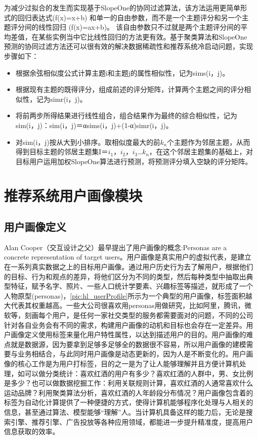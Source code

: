 		为减少过拟合的发生而实现基于SlopeOne的协同过滤算法，该方法运用更简单形式的回归表达式(f(x)=x+b) 和单一的自由参数，而不是一个主题评分和另一个主题评分间的线性回归 (f(x)=ax+b)。 该自由参数只不过就是两个主题评分间的平均差值，在某些实例当中它比线性回归的方法更有效。基于聚类算法和SlopeOne预测的协同过滤方法还可以很有效的解决数据稀疏性和推荐系统冷启动问题，实现步骤如下：
		\begin{itemize}
		\item 根据余弦相似度公式计算主题i和主题j的属性相似性，记为sims(i，j)。
		\item 根据现有主题的既得评分，组成前述的评分矩阵，计算两个主题之间的评分相似性，记为simr(i，j)。
		\item 将前两步所得结果进行线性组合，组合结果作为最终的综合相似性，记为sim(i，j)：sim(i，j)＝αsims(i，j)+(1-α)simr(i，j)。
		\item 对sim(i，j)按从大到小排序。取相似度最大的前$k_n$个主题作为邻居主题，从而得到目标主题的邻居主题集I＝{$i_1$，$i_2$，$i_3$…$k_n$}，在这个邻居主题集的基础上，对目标用户运用加权SlopeOne算法进行预测，将预测评分填入空缺的评分矩阵。
		\end{itemize}

	\section{推荐系统用户画像模块}
		\subsection{用户画像定义}
		\label{chap:example}
		Alan Cooper（交互设计之父）最早提出了用户画像的概念:Personas are a concrete representation of target users。用户画像是真实用户的虚拟代表，是建立在一系列真实数据之上的目标用户画像。通过用户历史行为去了解用户，根据他们的目标、行为和观点的差异，将他们区分为不同的类型，然后每种类型中抽取出典型特征，赋予名字、照片、一些人口统计学要素、兴趣标签等描述，就形成了一个人物原型(personas)，\autoref{pic:hl_userProfile}所示为一个典型的用户画像，标签面积越大代表其权重越高。一些大公司很喜欢用personas用做研究，比如阿里，腾讯，微软等，刻画每个用户，是任何一家社交类型的服务都需要面对的问题，不同的公司针对各自业务会有不同的需求，构建用户画像的动机和目标也会存在一定差异。用户画像定义使用标签来量化用户特性属性，以达到描述用户的目的。用户画像的难点就是数据源，因为要拿到足够多足够全的数据很不容易，所以用户画像的建模需要与业务相结合，与此同时用户画像是动态更新的，因为人是不断变化的。用户画像的核心工作是为用户打标签，目的之一是为了让人能够理解并且方便计算机处理，如可以做分类统计：喜欢红酒的用户有多少？喜欢红酒的人群中，男、女比例是多少？也可以做数据挖掘工作：利用关联规则计算，喜欢红酒的人通常喜欢什么运动品牌？利用聚类算法分析，喜欢红酒的人年龄段分布情况？用户画像包含着的标签为自动化计算提供了一种便捷的方式，使得计算机能够程序化处理与人相关的信息，甚至通过算法、模型能够“理解”人。当计算机具备这样的能力后，无论是搜索引擎、推荐引擎、广告投放等各种应用领域，都能进一步提升精准度，提高用户信息获取的效率。

